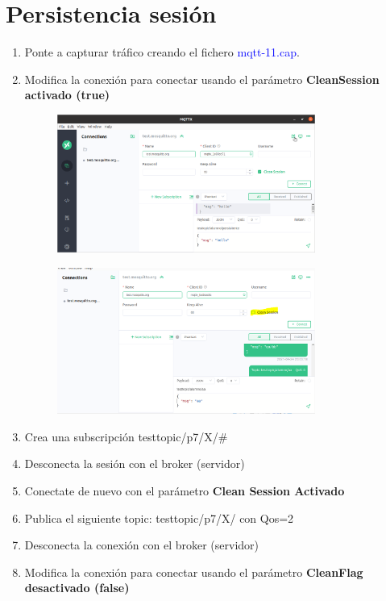 \documentclass[12pt, a4paper]{report}
\begin{document}
\chapter{Persistencia sesión}
\begin{enumerate}
	\item Ponte a capturar tráfico creando el fichero \textcolor{blue}{mqtt-11.cap}.
	\item Modifica la conexión para conectar usando el parámetro \textbf{CleanSession activado (true)}
	\begin{figure}[H]
		\centering
		\includegraphics[width=0.8\textwidth]{enun20}
	\end{figure}
	\begin{figure}[H]
		\centering
		\includegraphics[width=0.8\textwidth]{enun21}
	\end{figure}
	\item Crea una subscripción testtopic/p7/X/\#
	\item Desconecta la sesión con el broker (servidor)
	\item Conectate de nuevo con el parámetro \textbf{Clean Session Activado}
	\item Publica el siguiente topic: testtopic/p7/X/ con Qos=2
	\item Desconecta la conexión con el broker (servidor)
	\item Modifica la conexión para conectar usando el parámetro \textbf{CleanFlag desactivado (false)}

\end{enumerate}
\end{document}
